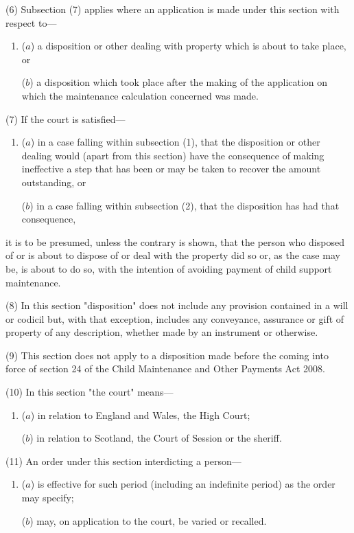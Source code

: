 \documentclass[a4paper]{article}
\begin{document}
(6)
Subsection (7) applies where an application is made under this section with respect to---
\begin{enumerate}\item[]
($a$) a disposition or other dealing with property which is about to take place, or

($b$) a disposition which took place after the making of the application on which the maintenance calculation concerned was made.
\end{enumerate}

(7) If the court is satisfied---
\begin{enumerate}\item[]
($a$) in a case falling within subsection (1), that the disposition or other dealing would (apart from this section) have the consequence of making ineffective a step that has been or may be taken to recover the amount outstanding, or

($b$) in a case falling within subsection (2), that the disposition has had that consequence,
\end{enumerate}
it is to be presumed, unless the contrary is shown, that the person who disposed of or is about to dispose of or deal with the property did so or, as the case may be, is about to do so, with the intention of avoiding payment of child support maintenance.

(8)
In this section "disposition" does not include any provision contained in a will or codicil but, with that exception, includes any conveyance, assurance or gift of property of any description, whether made by an instrument or otherwise.

(9)
This section does not apply to a disposition made before the coming into force of section 24 of the Child Maintenance and Other Payments Act 2008.

(10)
In this section "the court" means---
\begin{enumerate}\item[]
($a$) in relation to England and Wales, the High Court;

($b$) in relation to Scotland, the Court of Session or the sheriff.
\end{enumerate}

(11) An order under this section interdicting a person---
\begin{enumerate}\item[]
($a$) is effective for such period (including an indefinite period) as the order may specify;

($b$) may, on application to the court, be varied or recalled.
\end{enumerate}
\end{document}

